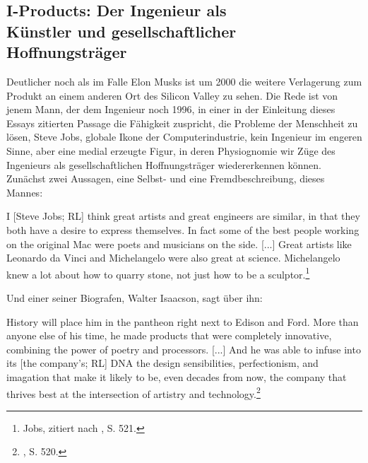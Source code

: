 \documentclass[%
	fontsize=10pt,%
	twoside,%
	headings=optiontoheadandtoc,%
	showtrims]{scrbook}
\renewenvironment{quote}{%
  \addmargin[\genericindent]{0pt}%
  \KOMAoptions{parskip=true}%
  \ifdim\parskip>0pt\else\addvspace{\intextsep}\fi
}{%
  \par
  \endaddmargin\vspace{\intextsep}
}
\begin{document}
\subsection[I-Products: Der Ingenieur als    Künstler und gesellschaftlicher    Hoffnungsträger]{I-Products: Der Ingenieur als \- \protect\\ Künstler und gesellschaftlicher\- \protect\\  Hoffnungsträger}
\par Deutlicher noch als im Falle Elon Musks ist um 2000 die weitere Verlagerung zum Produkt an einem anderen Ort des Silicon Valley zu sehen. Die Rede ist von jenem Mann, der dem Ingenieur noch 1996, in einer in der Einleitung dieses Essays zitierten Passage die Fähigkeit zuspricht, die Probleme der Menschheit zu lösen, Steve Jobs, globale Ikone der Computerindustrie, kein Ingenieur im engeren Sinne, aber eine medial erzeugte Figur, in deren Physiognomie wir Züge des Ingenieurs als gesellschaftlichen Hoffnungsträger wiedererkennen können. Zunächst zwei Aussagen, eine Selbst- und eine Fremdbeschreibung, dieses Mannes:\label{JOBS}\begin{quote}
\par I {[}Steve Jobs; RL{]} think great artists and great engineers are similar, in that they both have a desire to express themselves. In fact some of the best people working on the original Mac were poets and musicians on the side. {[}...{]} Great artists like Leonardo da Vinci and Michelangelo were also great at science. Michelangelo knew a lot about how to quarry stone, not just how to be a sculptor.\footnote{Jobs, zitiert nach \cite[][]{isaacson2011a}, S. 521.} 
\end{quote}
\par Und einer seiner Biografen, Walter Isaacson, sagt über ihn:\begin{quote}
\par History will place him in the pantheon right next to Edison and Ford. More than anyone else of his time, he made products that were completely innovative, combining the power of poetry and processors. {[}...{]} And he was able to infuse into its {[}the company\textquoteright{}s; RL{]} DNA the design sensibilities, perfectionism, and imagation that make it likely to be, even decades from now, the company that thrives best at the intersection of artistry and technology.\footnote{\cite[][]{isaacson2011a}, S. 520.} 
\end{quote}
\end{document}
